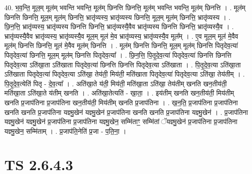 \documentclass[17pt]{extarticle}
\begin{document}
40. भ॒व॒न्ति॒ मूल॒म् मूल॑म् भवन्ति भवन्ति॒ मूल॑म् छिनत्ति छिनत्ति॒ मूल॑म् भवन्ति भवन्ति॒ मूल॑म् छिनत्ति । . मूल॑म् छिनत्ति छिनत्ति॒ मूल॒म् मूल॑म् छिनत्ति॒ भ्रातृ॑व्यस्य॒ भ्रातृ॑व्यस्य छिनत्ति॒ मूल॒म् मूल॑म् छिनत्ति॒ भ्रातृ॑व्यस्य । . छि॒न॒त्ति॒ भ्रातृ॑व्यस्य॒ भ्रातृ॑व्यस्य छिनत्ति छिनत्ति॒ भ्रातृ॑व्यस्यै॒वैव भ्रातृ॑व्यस्य छिनत्ति छिनत्ति॒ भ्रातृ॑व्यस्यै॒व । . भ्रातृ॑व्यस्यै॒वैव भ्रातृ॑व्यस्य॒ भ्रातृ॑व्यस्यै॒व मूल॒म् मूल॑ मे॒व भ्रातृ॑व्यस्य॒ भ्रातृ॑व्यस्यै॒व मूल᳚म् । . ए॒व मूल॒म् मूल॑ मे॒वैव मूल॑म् छिनत्ति छिनत्ति॒ मूल॑ मे॒वैव मूल॑म् छिनत्ति । . मूल॑म् छिनत्ति छिनत्ति॒ मूल॒म् मूल॑म् छिनत्ति पितृदेव॒त्या॑ पितृदेव॒त्या॑ छिनत्ति॒ मूल॒म् मूल॑म् छिनत्ति पितृदेव॒त्या᳚ । . छि॒न॒त्ति॒ पि॒तृ॒दे॒व॒त्या॑ पितृदेव॒त्या॑ छिनत्ति छिनत्ति पितृदेव॒त्या ऽति॑खा॒ता ऽति॑खाता पितृदेव॒त्या॑ छिनत्ति छिनत्ति 
पितृदेव॒त्या ऽति॑खाता । . पि॒तृ॒दे॒व॒त्या ऽति॑खा॒ता ऽति॑खाता पितृदेव॒त्या॑ पितृदेव॒त्या ऽति॑खा॒ तेय॑ती॒ मिय॑ती॒ मति॑खाता पितृदेव॒त्या॑ 
पितृदेव॒त्या ऽति॑खा॒ तेय॑तीम् । . पि॒तृ॒दे॒व॒त्येति॑ पितृ - दे॒व॒त्या᳚ । . अति॑खा॒ते य॑ती॒ मिय॑ती॒ मति॑खा॒ता ऽति॑खा॒ तेय॑तीम् खनति खन॒तीय॑ती॒ मति॑खा॒ता ऽति॑खा॒ते य॑तीम् खनति । . अति॑खा॒तेत्यति॑ - खा॒ता॒ । . इय॑तीम् खनति खन॒तीय॑ती॒ मिय॑तीम् खनति प्र॒जाप॑तिना प्र॒जाप॑तिना खन॒तीय॑ती॒ मिय॑तीम् खनति प्र॒जाप॑तिना । . ख॒न॒ति॒ प्र॒जाप॑तिना प्र॒जाप॑तिना खनति खनति प्र॒जाप॑तिना यज्ञ्मु॒खेन॑ यज्ञ्मु॒खेन॑ प्र॒जाप॑तिना खनति खनति प्र॒जाप॑तिना यज्ञ्मु॒खेन॑ । . प्र॒जाप॑तिना यज्ञ्मु॒खेन॑ यज्ञ्मु॒खेन॑ प्र॒जाप॑तिना प्र॒जाप॑तिना यज्ञ्मु॒खेन॒ सम्मि॑ताꣳ॒॒ सम्मि॑तां ॅयज्ञ्मु॒खेन॑ प्र॒जाप॑तिना प्र॒जाप॑तिना यज्ञ्मु॒खेन॒ सम्मि॑ताम् । . प्र॒जाप॑ति॒नेति॑ प्र॒जा - प॒ति॒ना॒ । \newline
\pagebreak
{}
\section*{ TS 2.6.4.3 }
\end{document}

